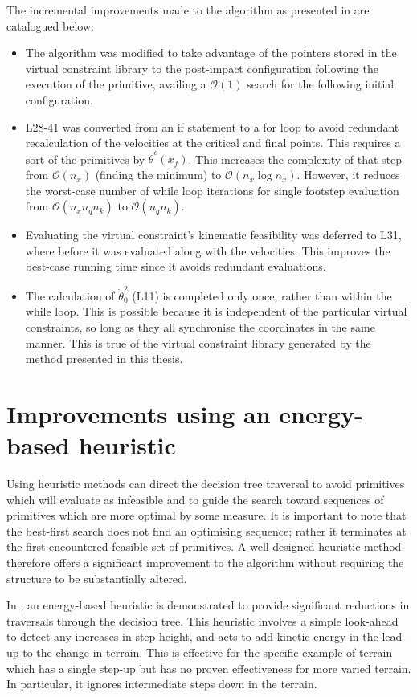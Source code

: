 The incremental improvements made to the algorithm as presented in \cite{manchester13planning} are catalogued below:
\begin{itemize}
	\item The algorithm was modified to take advantage of the pointers stored in the virtual constraint library to the post-impact configuration following the execution of the primitive, availing a $\mathcal{O}(1)$ search for the following initial configuration.
	\item L28-41 was converted from an if statement to a for loop to avoid redundant recalculation of the velocities at the critical and final points. This requires a sort of the primitives by $\dot{\theta}^c(x_f)$. This increases the complexity of that step from $\mathcal{O}(n_x)$ (finding the minimum) to $\mathcal{O}(n_x\log n_x)$. However, it reduces the worst-case number of while loop iterations for single footstep evaluation from $\mathcal{O}(n_xn_qn_k)$ to $\mathcal{O}(n_qn_k)$.
	\item Evaluating the virtual constraint's kinematic feasibility was deferred to L31, where before it was evaluated along with the velocities. This improves the best-case running time since it avoids redundant evaluations.
	\item The calculation of $\dot{\theta}_0^2$ (L11) is completed only once, rather than within the while loop. This is possible because it is independent of the particular virtual constraints, so long as they all synchronise the coordinates in the same manner. This is true of the virtual constraint library generated by the method presented in this thesis.
\end{itemize}

\section[Energy-based heuristic]{Improvements using an energy-based heuristic}
Using heuristic methods can direct the decision tree traversal to avoid primitives which will evaluate as infeasible and to guide the search toward sequences of primitives which are more optimal by some measure. It is important to note that the best-first search does not find an optimising sequence; rather it terminates at the first encountered feasible set of primitives. A well-designed heuristic method therefore offers a significant improvement to the algorithm without requiring the structure to be substantially altered.

In \cite{manchester13planning}, an energy-based heuristic is demonstrated to provide significant reductions in traversals through the decision tree. This heuristic involves a simple look-ahead to detect any increases in step height, and acts to add kinetic energy in the lead-up to the change in terrain. This is effective for the specific example of terrain which has a single step-up but has no proven effectiveness for more varied terrain. In particular, it ignores intermediate steps down in the terrain.


